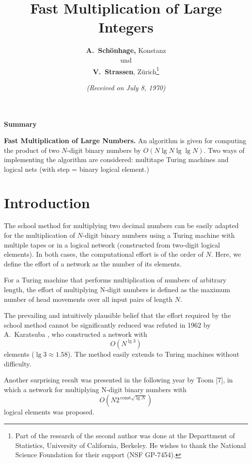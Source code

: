\documentclass{article}
\begin{document}
\title{Fast Multiplication of Large Integers}
\author{\textbf{A.\ Schönhage,} Konstanz \\ und \\ \textbf{V.\ Strassen}, Zürich\footnote{Part of the research of the second author was done at the Departtment of Statistics, University of California, Berkeley. He wishes to thank the National Science Foundation for their support (NSF GP-7454).}}
\date{\textit{(Received on July 8, 1970)}}
\renewcommand{\thefootnote}{\arabic{footnote}}
\maketitle
\begin{center}
\textbf{Summary}
\end{center}

\textbf{Fast Multiplication of Large Numbers.} An algorithm is given for computing the product of two $N$-digit binary numbers by $O(N \lg N \lg \lg N)$. Two ways of implementing the algorithm are considered: multitape Turing machines and logical nets (with step = binary logical element.)

\section{Introduction}

The school method for multiplying two decimal numbers can be easily adapted for the multiplication of $N$-digit binary numbers using a Turing machine with multiple tapes or in a logical network (constructed from two-digit logical elements). In both cases, the computational effort is of the order of $N$. Here, we define the effort of a network as the number of its elements.

For a Turing machine that performs multiplication of numbers of arbitrary length, the effort of multiplying N-digit numbers is defined as the maximum number of head movements over all input pairs of length $N$.

The prevailing and intuitively plausible belief that the effort required by the school method cannot be significantly reduced was refuted in 1962 by A.\ Karatsuba \cite{karatsuba}, who constructed a network with
\[
O\left(N^{\lg 3}\right)
\]
elements ($\lg 3 \approx 1.58$). The method easily extends to Turing machines without difficulty.

Another surprising result was presented in the following year by Toom [7], in which a network for multiplying N-digit binary numbers with
\[
O(N 2^{\, \text{const} \sqrt{\lg N}})
\] logical elements was proposed.
\end{document}
